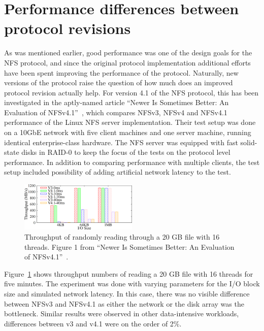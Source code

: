 
\section{Performance differences between protocol revisions} \label{sect:NFSv41}

As was mentioned earlier, good performance was one of the design goals for the NFS protocol,
and since the original protocol implementation additional efforts have been spent improving the performance of the protocol.
Naturally, new versions of the protocol raise the question of how much does an improved protocol revision actually help.
For version 4.1 of the NFS protocol, this has been investigated in the aptly-named article ``Newer Is Sometimes Better: An Evaluation of NFSv4.1''~\cite{NFSv4Better}, which compares NFSv3, NFSv4 and NFSv4.1 performance of the Linux NFS server implementation.
Their test setup was done on a 10GbE network with five client machines and one server machine, running identical enterprise-class hardware.
The NFS server was equipped with fast solid-state disks in RAID-0 to keep the focus of the tests on the protocol level performance.
In addition to comparing performance with multiple clients, the test setup included possibility of adding artificial network latency to the test.

\begin{figure}[h]
\centering\includegraphics[width=0.5\textwidth]{images/nfsv41better-random-read-throughput.png}
\caption{Throughput of randomly reading through a 20 GB file with 16 threads. Figure 1 from ``Newer Is Sometimes Better: An Evaluation of NFSv4.1''~\cite{NFSv4Better}.}
\label{fig:NFSv41ReadThroughput}
\end{figure}

Figure~\ref{fig:NFSv41ReadThroughput} shows throughput numbers of reading a 20 GB file with 16 threads for five minutes.
The experiment was done with varying parameters for the I/O block size and simulated network latency.
In this case, there was no visible difference between NFSv3 and NFSv4.1 as either the network or the disk array was the bottleneck.
Similar results were observed in other data-intensive workloads,
differences between v3 and v4.1 were on the order of 2\%.

